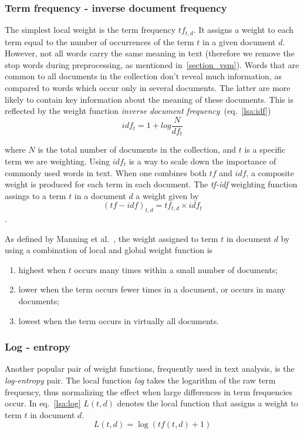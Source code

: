 \subsubsection{Term frequency - inverse document frequency}
\label{lsa:tf-idf-section}
The simplest local weight is the term frequency $tf_{t,d}$. It assigns a weight to each term equal to the number of occurrences of the term $t$ in a given document $d$. However, not all words carry the same meaning in text (therefore we remove the stop words during preprocessing, as mentioned in~\ref{section_vsm}). Words that are common to all documents in the collection don't reveal much information, as compared to words which occur only in several documents. The latter are more likely to contain key information about the meaning of these documents.  This is reflected by the weight function \textit{inverse document frequency}~(eq.~\ref{lsa:idf})
\begin{equation}
\label{lsa:idf}
idf_{t}=1 + log\frac{N}{df_{t}}
\end{equation}

where $N$ is the total number of documents in the collection, and $t$ is a specific term we are weighting. Using $idf_{t}$ is a way to scale down the importance of commonly used words in text. When one combines both $tf$ and $idf$, a composite weight is produced for each term in each document. The \textit{tf-idf} weighting function assings to a term $t$ in a document $d$ a weight given by 
\begin{equation}
\label{lsa:tf_idf}
(tf-idf)_{t,d}=tf_{t,d} \times idf_{t}
\end{equation}. 

As defined by Manning et al.~\cite{IRbook2008}, the weight assigned to term $t$ in document $d$ by using a combination of local and global weight function is 
\begin{enumerate}
\item highest when $t$ occurs many times within a small number of documents;
\item lower when the term occurs fewer times in a document, or occurs in many documents;
\item lowest when the term occurs in virtually all documents.
\end{enumerate} 

\subsubsection{Log - entropy}
\label{lsa:log-entropy-section}
Another popular pair of weight functions, frequently used in text analysis, is the \textit{log-entropy} pair. The local function \textit{log} takes the logarithm of the raw term frequency, thus normalizing the effect when large differences in term frequencies occur. In eq.~\ref{lsa:log} $L(t,d)$ denotes the local function that assigns a weight to term $t$ in document $d$. \\
\begin{equation}
L(t,d)=\log(tf(t,d)+1)
\label{lsa:log}
\end{equation}

